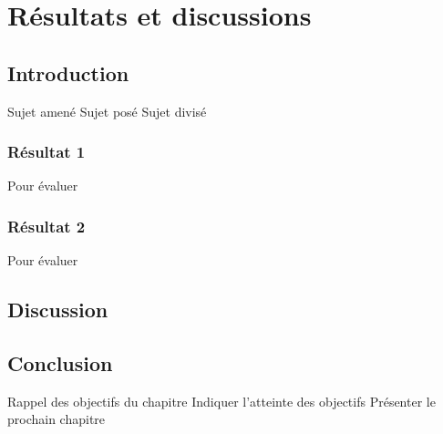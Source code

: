 \chapter{Résultats et discussions}
\label{chap:chap_4}
\section*{Introduction}
Sujet amené
Sujet posé
Sujet divisé

\subsection{Résultat 1}
Pour évaluer 

\subsection{Résultat 2}
Pour évaluer 

\section{Discussion}


\section{Conclusion}
Rappel des objectifs du chapitre
Indiquer l'atteinte des objectifs
Présenter le prochain chapitre
